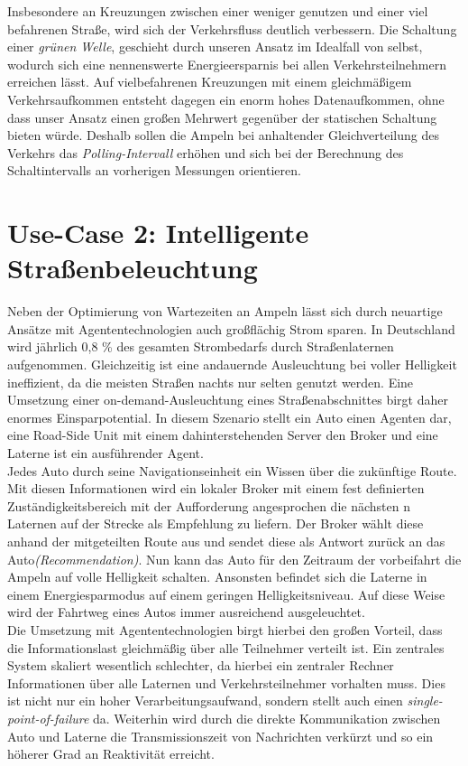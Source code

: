 Insbesondere an Kreuzungen zwischen einer weniger genutzen und einer viel befahrenen Straße, wird sich der Verkehrsfluss deutlich verbessern. Die Schaltung einer \textit{grünen Welle}, geschieht durch unseren Ansatz im Idealfall von selbst, wodurch sich eine nennenswerte Energieersparnis bei allen Verkehrsteilnehmern erreichen lässt. Auf vielbefahrenen Kreuzungen mit einem gleichmäßigem Verkehrsaufkommen entsteht dagegen ein enorm hohes Datenaufkommen, ohne dass unser Ansatz einen großen Mehrwert gegenüber der statischen Schaltung bieten würde. Deshalb sollen die Ampeln bei anhaltender Gleichverteilung des Verkehrs das \textit{Polling-Intervall} erhöhen und sich bei der Berechnung des Schaltintervalls an vorherigen Messungen orientieren. 

\section*{Use-Case 2: Intelligente Straßenbeleuchtung}
Neben der Optimierung von Wartezeiten an Ampeln lässt sich durch neuartige Ansätze mit Agententechnologien auch großflächig Strom sparen. In Deutschland wird jährlich 0,8 \% des gesamten Strombedarfs durch Straßenlaternen aufgenommen. Gleichzeitig ist eine andauernde Ausleuchtung bei voller Helligkeit ineffizient, da die meisten Straßen nachts nur selten genutzt werden. Eine Umsetzung einer on-demand-Ausleuchtung eines Straßenabschnittes birgt daher enormes Einsparpotential. 
In diesem Szenario stellt ein Auto einen Agenten dar, eine Road-Side Unit mit einem dahinterstehenden Server den Broker und eine Laterne ist ein ausführender Agent.\\

Jedes Auto durch seine Navigationseinheit ein Wissen über die zukünftige Route. Mit diesen Informationen wird ein lokaler Broker mit einem fest definierten Zuständigkeitsbereich mit der Aufforderung angesprochen die nächsten n Laternen auf der Strecke als Empfehlung zu liefern. Der Broker wählt diese anhand der mitgeteilten Route aus und sendet diese als Antwort zurück an das Auto\textit{(Recommendation)}. Nun kann das Auto für den Zeitraum der vorbeifahrt die Ampeln auf volle Helligkeit schalten. Ansonsten befindet sich die Laterne in einem Energiesparmodus auf einem geringen Helligkeitsniveau. Auf diese Weise wird der Fahrtweg eines Autos immer ausreichend ausgeleuchtet.\\

Die Umsetzung mit Agententechnologien birgt hierbei den großen Vorteil, dass die Informationslast gleichmäßig über alle Teilnehmer verteilt ist. Ein zentrales System skaliert wesentlich schlechter, da hierbei ein zentraler Rechner Informationen über alle Laternen und Verkehrsteilnehmer vorhalten muss. Dies ist nicht nur ein hoher Verarbeitungsaufwand, sondern stellt auch einen \textit{single-point-of-failure} da. Weiterhin wird durch die direkte Kommunikation zwischen Auto und Laterne die Transmissionszeit von Nachrichten verkürzt und so ein höherer Grad an Reaktivität erreicht.\\

